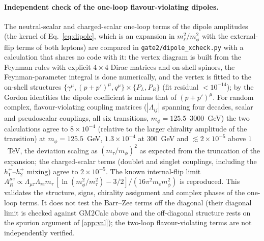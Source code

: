 \documentclass[twocolumn,epjc3]{svjour3}
\begin{document}
\paragraph{Independent check of the one-loop flavour-violating dipoles.} The neutral-scalar and charged-scalar one-loop terms of the dipole amplitudes (the kernel of Eq.~\eqref{eq:dipole}, which is an expansion in $m_\ell^2/m_\phi^2$ with the external-flip terms of both leptons) are compared in \texttt{gate2/dipole\_xcheck.py} with a calculation that shares no code with it: the vertex diagram is built from the Feynman rules with explicit $4\times4$ Dirac matrices and on-shell spinors, the Feynman-parameter integral is done numerically, and the vertex is fitted to the on-shell structures $\{\gamma^\mu,(p+p')^\mu,q^\mu\}\times\{P_L,P_R\}$ (fit residual $<10^{-14}$); by the Gordon identities the dipole coefficient is minus that of $(p+p')^\mu$. For random complex, flavour-violating coupling matrices ($|\Lambda_{ij}|$ spanning four decades, scalar and pseudoscalar couplings, all six transitions, $m_\phi=125.5$--$3000$~GeV) the two calculations agree to $8\times10^{-4}$ (relative to the larger chirality amplitude of the transition) at $m_\phi=125.5$~GeV, $1.3\times10^{-4}$ at $300$~GeV and $\lesssim2\times10^{-5}$ above $1$~TeV, the deviation scaling as $(m_\tau/m_\phi)^2$ as expected from the truncation of the expansion; the charged-scalar terms (doublet and singlet couplings, including the $h_1^+$--$h_2^+$ mixing) agree to $2\times10^{-5}$. The known internal-flip limit $A_R^{\mu e}\propto\Lambda_{\mu\tau}\Lambda_{\tau e}m_\tau\,[\ln(m_\phi^2/m_\tau^2)-3/2]/(16\pi^2m_em_\phi^2)$ is reproduced. This validates the structure, signs, chirality assignment and complex phases of the one-loop terms. It does not test the Barr--Zee terms off the diagonal (their diagonal limit is checked against GM2Calc above and the off-diagonal structure rests on the spurion argument of \ref{app:val}); the two-loop flavour-violating terms are not independently verified.
\end{document}
